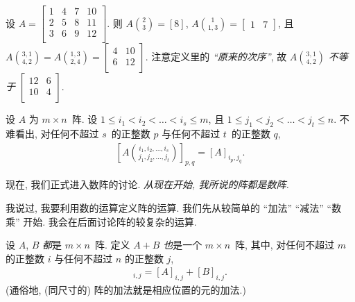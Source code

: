 \begin{example}
    设
    \(
    A =
    \begin{bmatrix}
        1 & 4 & 7 & 10 \\
        2 & 5 & 8 & 11 \\
        3 & 6 & 9 & 12 \\
    \end{bmatrix}.
    \)
    则
    \(
    {\displaystyle A\binom{2}{3}} =
        [8]
    \),
    \(
    {\displaystyle A\binom{1}{1,3}} =
    \begin{bmatrix}
        1 & 7
    \end{bmatrix}
    \),
    且
    \(
    {\displaystyle A\binom{3,1}{4,2} =
            A\binom{1,3}{2,4}} =
    \begin{bmatrix}
        4 & 10 \\
        6 & 12 \\
    \end{bmatrix}
    \).
    注意定义里的 \emph{``原来的次序''},
    故
    \(
    {\displaystyle A\binom{3,1}{4,2}}
    \)
    \emph{不等于}
    \(
    \begin{bmatrix}
        12 & 6 \\
        10 & 4 \\
    \end{bmatrix}.
    \)
\end{example}

设 \(A\) 为 \(m \times n\)~阵.
设
\(1 \leq i_1 < i_2 < \dots < i_s \leq m\),
且
\(1 \leq j_1 < j_2 < \dots < j_t \leq n\).
不难看出,
对任何不超过 \(s\)~的正整数 \(p\)
与任何不超过 \(t\)~的正整数 \(q\),
\begin{align*}
    \left[
        A\binom{i_1, i_2, \dots, i_s}{j_1, j_2, \dots, j_t}
        \right]_{p,q}
    = [A]_{i_p, j_q}.
\end{align*}

\vspace{2ex}

现在, 我们正式进入数阵的讨论.
\emph{从现在开始, 我所说的阵都是数阵.}

我说过, 我要利用数的运算定义阵的运算.
我们先从较简单的 ``加法'' ``减法'' ``数乘'' 开始.
我会在后面讨论阵的较复杂的运算.

\begin{definition}[阵的加法]
    设 \(A\), \(B\) \emph{都}是 \(m \times n\)~阵.
    定义 \(A + B\) \emph{也}是一个 \(m \times n\)~阵,
    其中, 对任何不超过 \(m\) 的正整数 \(i\)
    与任何不超过 \(n\) 的正整数 \(j\),
    \begin{align*}
        [A + B]_{i,j} = [A]_{i,j} + [B]_{i,j}.
    \end{align*}
    (通俗地, (同尺寸的) 阵的加法就是相应位置的元的加法.)
\end{definition}

